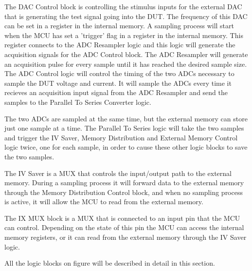 The DAC Control block is controlling the stimulus inputs for the external DAC that is generating the test signal going into the DUT. The frequency of this DAC can be set in a register in the internal memory. A sampling process will start when the MCU has set a 'trigger' flag in a register in the internal memory. This register connects to the ADC Resampler logic and this logic will generate the acquisition signals for the ADC Control block. The ADC Resampler will generate an acquisition pulse for every sample until it has reached the desired sample size. The ADC Control logic will control the timing of the two ADCs necessary to sample the DUT voltage and current. It will sample the ADCs every time it recieves an acquisition input signal from the ADC Resampler and send the samples to the Parallel To Series Converter logic.

The two ADCs are sampled at the same time, but the external memory can store just one sample at a time. The Parallel To Series logic will take the two samples and trigger the IV Saver, Memory Distribution and External Memory Control logic twice, one for each sample, in order to cause these other logic blocks to save the two samples.

The IV Saver is a MUX that controls the input/output path to the external memory. During a sampling process it will forward data to the external memory through the Memory Distribution Control block, and when no sampling process is active, it will allow the MCU to read from the external memory.

The IX MUX block is a MUX that is connected to an input pin that the MCU can control. Depending on the state of this pin the MCU can access the internal memory registers, or it can read from the external memory through the IV Saver logic.

All the logic blocks on figure  will be described in detail in this section.